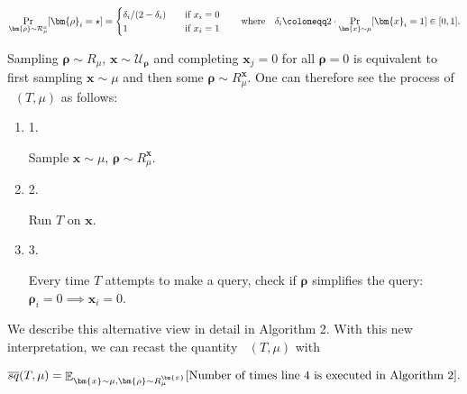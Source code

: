 \[\begin{gathered}
\Pr_{\bm{\rho}\sim\mathcal{R}_{\mu}^{x}}[\bm{\rho}_{i}=\star]=\begin{cases}\delta_{i}/(2-\delta_{i})&\quad\textup{if $x_{i}=0$}\\
1&\quad\textup{if $x_{i}=1$}\end{cases}\quad\quad\text{where}\quad\delta_{i}\coloneqq 2\cdot\Pr_{\bm{x}\sim\mu}[\bm{x}_{i}=1]\in[0,1].
\end{gathered}\]


Sampling $\bm{\rho}\sim R_{\mu}$, $\bm{x}\sim\mathcal{U}_{\bm{\rho}}$ and completing $\bm{x}_{j}=0$ for all $\bm{\rho}=0$ is equivalent to first sampling $\bm{x}\sim\mu$ and then some $\bm{\rho}\sim R_{\mu}^{\bm{x}}$. One can therefore see the process of $\mathop{\overline{sq}}(T,\mu)$ as follows:\par


\begin{enumerate}


\item[] 
1. 


Sample $\bm{x}\sim\mu$, $\bm{\rho}\sim R_{\mu}^{\bm{x}}$.\par





\item[] 
2. 


Run $T$ on $\bm{x}$.\par





\item[] 
3. 


Every time $T$ attempts to make a query, check if $\bm{\rho}$ simplifies the query: $\bm{\rho}_{i}=0\implies\bm{x}_{i}=0$.\par





\end{enumerate}


We describe this alternative view in detail in Algorithm 2. With this new interpretation, we can recast the quantity $\mathop{\overline{sq}}(T,\mu)$ with\par


\[\begin{gathered}
\mathop{\overline{sq}}(T,\mu)=\mathop{\mathbb{E}}\nolimits_{\bm{x}\sim\mu,\bm{\rho}\sim R_{\mu}^{\bm{x}}}[\text{Number of times
line\nobreak\ 4 is executed in Algorithm 2}].
\end{gathered}\]


